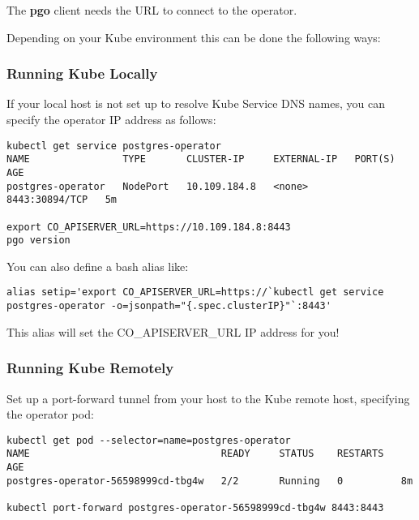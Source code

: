 \documentclass[letterpaper,12pt]{article}
\begin{document}
The \textbf{pgo} client needs the URL to connect to the operator.

Depending on your Kube environment this can be done the following ways:

\subsubsection{Running Kube Locally}\label{/_basic_installation/_configure_b_pgo_b_client/_running_kube_locally}

If your local host is not set up to resolve Kube Service DNS names, you can specify the operator IP address as follows:
\vspace{.75em}
\begin{lstlisting}
kubectl get service postgres-operator
NAME                TYPE       CLUSTER-IP     EXTERNAL-IP   PORT(S)          AGE
postgres-operator   NodePort   10.109.184.8   <none>        8443:30894/TCP   5m

export CO_APISERVER_URL=https://10.109.184.8:8443
pgo version
\end{lstlisting}

You can also define a bash alias like:
\vspace{.75em}
\begin{lstlisting}
alias setip='export CO_APISERVER_URL=https://`kubectl get service postgres-operator -o=jsonpath="{.spec.clusterIP}"`:8443'
\end{lstlisting}

This alias will set the CO\_APISERVER\_URL IP address for you!

\subsubsection{Running Kube Remotely}\label{/_basic_installation/_configure_b_pgo_b_client/_running_kube_remotely}

Set up a port-forward tunnel from your host to the Kube remote host, specifying the operator pod:
\vspace{.75em}
\begin{lstlisting}
kubectl get pod --selector=name=postgres-operator
NAME                                 READY     STATUS    RESTARTS   AGE
postgres-operator-56598999cd-tbg4w   2/2       Running   0          8m

kubectl port-forward postgres-operator-56598999cd-tbg4w 8443:8443
\end{lstlisting}
\end{document}
